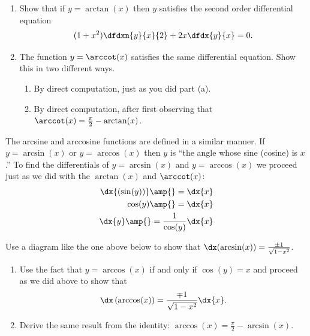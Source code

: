 \pagebreak[4]
\begin{embeddedproblem-enumerate}
  \begin{enumerate}[label={\bf{}(\alph*)}]
  \item Show that if $y=\arctan(x)$ then $y$ satisfies the second order
    differential equation
    $$
    (1+x^2)\dfdxn{y}{x}{2}+2x\dfdx{y}{x}=0.
    $$
  \item The function   $y=\arccot(x)$ satisfies the same differential
    equation. Show this in two different ways.
    \begin{enumerate}[label={\bf{}(\roman*)}]{}
    \item By direct computation, just as you did part (a).
    \item By direct computation, after first observing that $\arccot(x)=\frac\pi2-\arctan(x)$.
    \end{enumerate}
  \end{enumerate}{}
\end{embeddedproblem-enumerate}


The arcsine and arccosine functions are defined in a similar
manner. If $y=\arcsin(x)$ or $y=\arccos(x)$ then $y$ is ``the angle
whose sine (cosine) is $x$.''
To find the  differentials of $y=\arcsin(x)$ and $y=\arccos(x)$ we
proceed just as we did with the $\arctan(x)$ and $\arccot(x)$:
\begin{align*}
  \dx{(\sin(y))}\amp{}= \dx{x}\\
  \cos(y)\amp{}=\dx{x}\\
  \dx{y}\amp{}=\frac{1}{\cos(y)}\dx{x}
\end{align*}

\begin{ProficiencyDrill}
  \label{drill:InvSin1}
  Use a  diagram like the one above  below to show that
  $\dx(\arcsin(x))=\frac{\pm 1}{\sqrt{1-x^2}}$.
\end{ProficiencyDrill}

\begin{embeddedproblem-enumerate}{}
  \begin{enumerate}[label={\bf{}(\alph*)}]
  \item Use the fact that $y=\arccos(x)$ if and only if $\cos(y)=x$
    and proceed as we did above to show that
    $$
    \dx\left(\arccos(x)\right)= \frac{\mp 1}{\sqrt{1-x^2}}\dx{x}.
    $$
  \item Derive the same result from the identity:  $\arccos(x)=
    \frac{\pi}{2}-\arcsin(x)$.
  \end{enumerate}
\end{embeddedproblem-enumerate}


